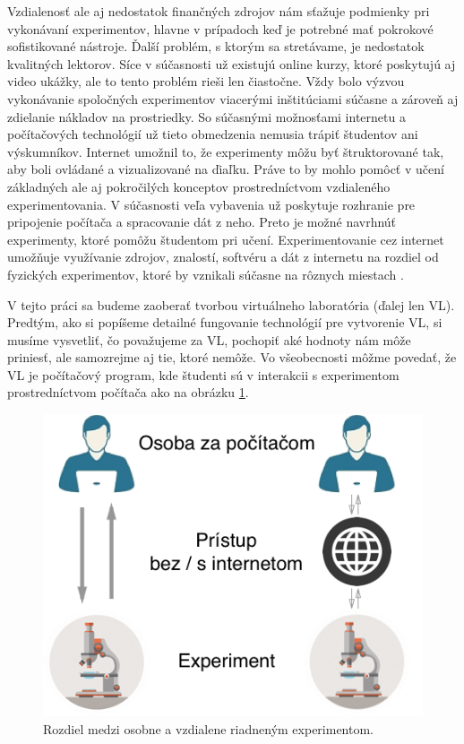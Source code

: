 Vzdialenosť ale aj nedostatok finančných zdrojov nám sťažuje podmienky pri vykonávaní experimentov, hlavne v prípadoch keď je potrebné mať pokrokové sofistikované nástroje. Ďalší problém, s ktorým sa stretávame, je nedostatok kvalitných lektorov. Síce v súčasnosti už existujú online kurzy, ktoré poskytujú aj video ukážky, ale to tento problém rieši len čiastočne. Vždy bolo výzvou vykonávanie spoločných experimentov viacerými inštitúciami súčasne a zároveň aj zdielanie nákladov na prostriedky. So súčasnými možnosťami internetu a počítačových technológií už tieto obmedzenia nemusia trápiť študentov ani výskumníkov. Internet umožnil to, že experimenty môžu byť štruktorované tak, aby boli ovládané a vizualizované na ďiaľku. Práve to by mohlo pomôcť v učení základných ale aj pokročilých konceptov prostredníctvom vzdialeného experimentovania. V súčasnosti veľa vybavenia už poskytuje rozhranie pre pripojenie počítača a spracovanie dát z neho. Preto je možné navrhnúť experimenty, ktoré pomôžu študentom pri učení. Experimentovanie cez internet umožňuje využívanie zdrojov, znalostí, softvéru a dát z internetu na rozdiel od fyzických experimentov, ktoré by vznikali súčasne na rôznych miestach \cite{vlabphylosopfy}.

V tejto práci sa budeme zaoberať tvorbou virtuálneho laboratória (ďalej len VL). Predtým, ako si popíšeme detailné fungovanie technológií pre vytvorenie VL, si musíme vysvetliť, čo považujeme za VL, pochopiť aké hodnoty nám môže priniesť, ale samozrejme aj tie, ktoré nemôže. Vo všeobecnosti môžme povedať, že VL je počítačový program, kde študenti sú v interakcii s experimentom prostredníctvom počítača ako na obrázku \ref{img-real-vs-remote}. 

\begin{figure}[H]
  \centering
  \includegraphics[scale=0.40]{img/VL_vs_real.png}
  \caption{Rozdiel medzi osobne a vzdialene riadneným experimentom.}
  \label{img-real-vs-remote}
\end{figure}

